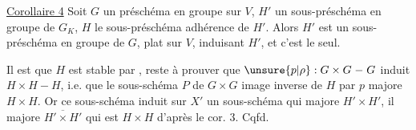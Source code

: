 \uline{Corollaire 4} Soit $G$ un préschéma en
groupe sur $V$, $H'$ un sous-préschéma en
groupe  de $G_K$, $H$ le sous-préschéma
adhérence de $H'$. Alors $H'$ est un
sous-préschéma en groupe de $G$, plat
sur $V$,  induisant $H'$, et c'est
le seul.

Il est  que $H$ est stable par
, reste à prouver que
$\unsure{p|\rho}:G\times G\mathrel{-}G$ induit $H\times H\mathrel{-}H$, i.e.
que le sous-schéma  $P$ de $G\times G$
image inverse de $H$ par $p$  majore
$H\times H$. Or ce sous-schéma induit
sur $X'$ un sous-schéma qui majore
$H'\times H'$,  il majore $\overline{H'\times H'}$ qui est
$H\times H$ d'après le cor. 3. Cqfd.

